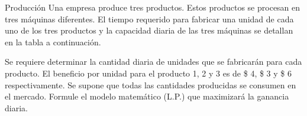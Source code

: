 \begin{frameExample}{Producción}{}
  Una empresa produce tres productos. Estos productos se procesan en tres máquinas diferentes. El tiempo requerido para fabricar una unidad de cada uno de los tres productos y la capacidad diaria de las tres máquinas se detallan en la tabla a continuación.

  {\centering
\par}

   Se requiere determinar la cantidad diaria de unidades que se fabricarán para cada producto. El beneficio por unidad para el producto 1, 2 y 3 es de \$ 4, \$ 3 y \$ 6 respectivamente. Se supone que todas las cantidades producidas se consumen en el mercado. Formule el modelo matemático (L.P.) que maximizará la ganancia diaria.
\end{frameExample}




